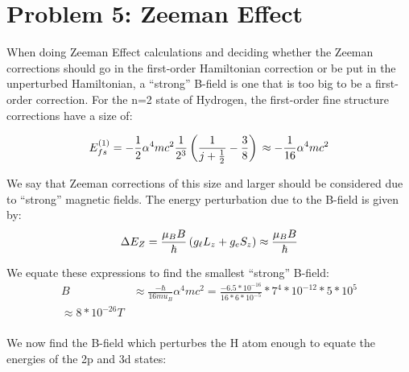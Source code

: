 \documentclass[10pt]{article} %
\begin{document}
\section{Problem 5: Zeeman Effect}
When doing Zeeman Effect calculations and deciding whether the Zeeman corrections should go in the
first-order Hamiltonian correction or be put in the unperturbed Hamiltonian, a ``strong'' B-field
is one that is too big to be a first-order correction. For the n=2 state of Hydrogen, the
first-order fine structure corrections have a size of:

\begin{equation*}
  E_{fs}^{(1)}
  = -\frac{1}{2}\alpha^4mc^2\frac{1}{2^3}\left(\frac{1}{j+\frac{1}{2}}-\frac{3}{8}\right)\\
  \approx -\frac{1}{16}\alpha^4mc^2\\
\end{equation*}

We say that Zeeman corrections of this size and larger should be considered due to ``strong''
magnetic fields. The energy perturbation due to the B-field is given by:\\

\begin{equation*}
  \Delta E_{Z} = \frac{\mu_B B}{\hbar}\left(g_\ell L_z + g_e S_z\right)
  \approx \frac{\mu_B B}{\hbar}\\
\end{equation*}

We equate these expressions to find the smallest ``strong'' B-field:\\

\begin{align*}
  B &\approx \frac{-\hbar}{16mu_B}\alpha^4mc^2
  = \frac{-6.5*10^{-16}}{16*6*10^{-5}}*7^4*10^{-12}*5*10^5\\
  \approx 8*10^{-26}T\\
\end{align*}

We now find the B-field which perturbes the H atom enough to equate the energies of the 2p and 3d
states:\\
\end{document}
